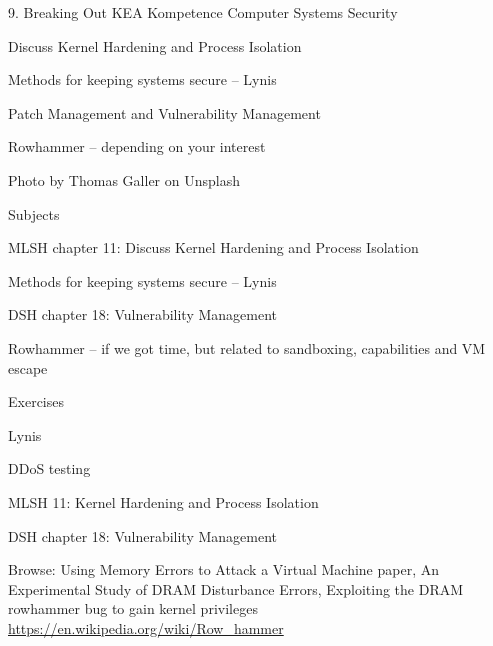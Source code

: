 \documentclass[Screen16to9,17pt]{foils}
\begin{document}
\mytitlepage
{9. Breaking Out}
{KEA Kompetence Computer Systems Security \the\year}





\begin{list2}
\item Discuss Kernel Hardening and Process Isolation
\item Methods for keeping systems secure -- Lynis
\item Patch Management and Vulnerability Management
\item Rowhammer -- depending on your interest
\end{list2}

{\small\hfill  Photo by Thomas Galler on Unsplash}


\begin{list1}
\item Subjects
\begin{list2}
\item MLSH chapter 11: Discuss Kernel Hardening and Process Isolation
\item Methods for keeping systems secure -- Lynis
\item DSH chapter 18: Vulnerability Management
\item Rowhammer -- if we got time, but related to sandboxing, capabilities and VM escape
\end{list2}
\item Exercises
\begin{list2}
\item Lynis
\item DDoS testing
\end{list2}
\end{list1}



\begin{list1}
\item MLSH 11: Kernel Hardening and Process Isolation
\item DSH chapter 18: Vulnerability Management
\item Browse: Using Memory Errors to Attack a Virtual Machine paper, An Experimental Study of DRAM Disturbance Errors, Exploiting the DRAM rowhammer bug to gain kernel privileges\\
 \url{https://en.wikipedia.org/wiki/Row_hammer}
\end{list1}
\end{document}
